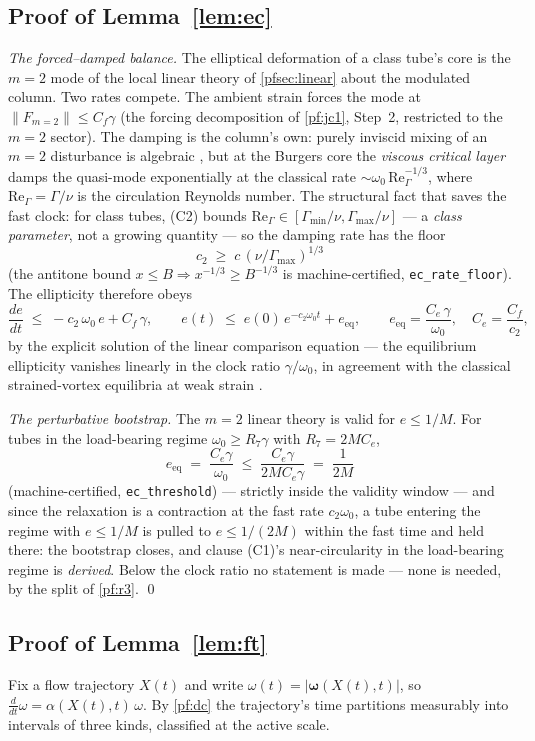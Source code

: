 \documentclass[11pt,letterpaper]{amsart}
\theoremstyle{definition}
\theoremstyle{remark}
\newcommand{\om}{\omega}
\newcommand{\vort}{\boldsymbol{\omega}}
\newcommand{\norm}[1]{\lVert #1 \rVert}
\newcommand{\abs}[1]{\lvert #1 \rvert}
\begin{document}
\subsection{Proof of Lemma~\ref{lem:ec}}\label{pf:ec}
\emph{The forced--damped balance.} The elliptical deformation of a class tube's core
is the $m=2$ mode of the local linear theory of \cref{pfsec:linear} about the
modulated column. Two rates compete. The ambient strain forces the mode at
$\norm{F_{m=2}}\le C_f\gamma$ (the forcing decomposition of \cref{pf:jc1}, Step~2,
restricted to the $m=2$ sector). The damping is the column's own: purely inviscid
mixing of an $m=2$ disturbance is algebraic
\cite{BCZV2019,Schecter2000}, but at the Burgers core the \emph{viscous critical
layer} damps the quasi-mode exponentially at the classical rate
$\sim\om_0\,\mathrm{Re}_\Gamma^{-1/3}$, where $\mathrm{Re}_\Gamma=\Gamma/\nu$ is the
circulation Reynolds number. The structural fact that saves the fast clock: for class
tubes, (C2) bounds $\mathrm{Re}_\Gamma\in[\Gamma_{\min}/\nu,\Gamma_{\max}/\nu]$ --- a
\emph{class parameter}, not a growing quantity --- so the damping rate has the floor
\[
c_2\;\ge\;c\,(\nu/\Gamma_{\max})^{1/3}
\]
(the antitone bound $x\le B\Rightarrow x^{-1/3}\ge B^{-1/3}$ is machine-certified,
\texttt{ec\_rate\_floor}). The ellipticity therefore obeys
\[
\frac{de}{dt}\;\le\;-c_2\,\om_0\,e+C_f\,\gamma,
\qquad
e(t)\;\le\;e(0)\,e^{-c_2\om_0t}+e_{\mathrm{eq}},
\qquad
e_{\mathrm{eq}}=\frac{C_e\,\gamma}{\om_0},\quad C_e=\frac{C_f}{c_2},
\]
by the explicit solution of the linear comparison equation --- the equilibrium
ellipticity vanishes linearly in the clock ratio $\gamma/\om_0$, in agreement with
the classical strained-vortex equilibria at weak strain
\cite{MooreSaffman1971,Kida1981}.

\emph{The perturbative bootstrap.} The $m=2$ linear theory is valid for
$e\le1/M$. For tubes in the load-bearing regime $\om_0\ge R_7\gamma$ with
$R_7=2MC_e$,
\[
e_{\mathrm{eq}}\;=\;\frac{C_e\gamma}{\om_0}\;\le\;\frac{C_e\gamma}{2MC_e\gamma}
\;=\;\frac{1}{2M}
\]
(machine-certified, \texttt{ec\_threshold}) --- strictly inside the validity window
--- and since the relaxation is a contraction at the fast rate $c_2\om_0$, a tube
entering the regime with $e\le1/M$ is pulled to $e\le1/(2M)$ within the fast time and
held there: the bootstrap closes, and clause (C1)'s near-circularity in the
load-bearing regime is \emph{derived}. Below the clock ratio no statement is made ---
none is needed, by the split of \cref{pf:r3}. \qed

\subsection{Proof of Lemma~\ref{lem:ft}}\label{pf:ft}
Fix a flow trajectory $X(t)$ and write $\om(t)=\abs{\vort(X(t),t)}$, so
$\tfrac{d}{dt}\om=\alpha(X(t),t)\,\om$. By \cref{pf:dc} the trajectory's time
partitions measurably into intervals of three kinds, classified at the active scale.
\end{document}
